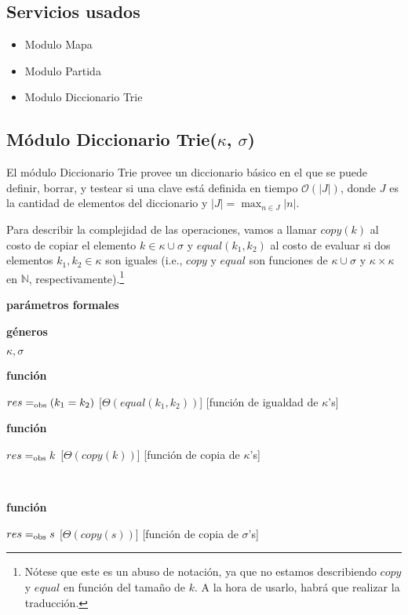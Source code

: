 \documentclass[10pt, a4paper]{article}
\newcommand{\bigO}{\mathcal{O}}
\begin{document}
\begin{Algoritmos}
        \subsection*{Servicios usados}

        \begin{itemize}
            \item Modulo Mapa
            \item Modulo Partida
            \item Modulo Diccionario Trie
        \end{itemize}

        \newpage

        \subsection*{Módulo Diccionario Trie($\kappa$, $\sigma$)}
        
        El módulo Diccionario Trie provee un diccionario básico en el que se puede definir, borrar, y testear si una clave está definida en tiempo $\bigO(|J|)$, donde $J$ es la cantidad de elementos del diccionario y $|J|=\max_{n\in J}{|n|}$. 
        
        Para describir la complejidad de las operaciones, vamos a llamar $copy(k)$ al costo de copiar el elemento $k \in \kappa \cup \sigma$ y $equal(k_1, k_2)$ al costo de evaluar si dos elementos $k_1, k_2 \in \kappa$ son iguales (i.e., $copy$ y $equal$ son funciones de $\kappa \cup \sigma$ y $\kappa \times \kappa$ en $\mathbb{N}$, respectivamente).\footnote{Nótese que este es un abuso de notación, ya que no estamos describiendo $copy$ y $equal$ en función del tamaño de $k$.  A la hora de usarlo, habrá que realizar la traducción.}
        
        \begin{Interfaz}
        
            \textbf{parámetros formales}\parindent\\
            \parbox{1.7cm}{\textbf{géneros}}$\kappa,\sigma$\\
            \parbox[t]{1.7cm}{\textbf{función}}\parbox[t]{.5\textwidth-\parindent-1.7cm}{%
            {$res =_{\mathrm{obs}} (k_1 = k_2)$}
            [$\Theta(equal(k_1, k_2))$]
            [función de igualdad de $\kappa$'s]
            }%
            \parbox[t]{1.7cm}{\textbf{función}}\parbox[t]{.5\textwidth-\parindent-1.7cm}{%
            {$res =_{\mathrm{obs}} k$}
            [$\Theta(copy(k))$]
            [función de copia de $\kappa$'s]
            }\\[2ex]
            \parbox[t]{1.7cm}{\textbf{función}}\parbox[t]{.5\textwidth-\parindent-1.7cm}{%
            {$res =_{\mathrm{obs}} s$}
            [$\Theta(copy(s))$]
            [función de copia de $\sigma$'s]
            }
        

\end{Interfaz}
\end{Algoritmos}
\end{document}
